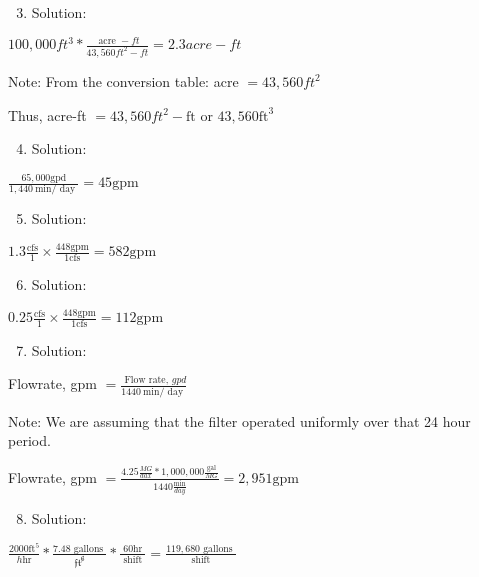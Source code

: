 \documentclass[10pt]{article}
\begin{document}
\begin{enumerate}
\begin{enumerate}
\begin{enumerate}
  \setcounter{enumi}{2}
  \item Solution:
\end{enumerate}

$100,000 f t^{3} * \frac{\text { acre }-f t}{43,560 f t^{2}-f t}=2.3 a c r e-f t$

Note: From the conversion table: acre $=43,560 f t^{2}$

Thus, acre-ft $=43,560 f t^{2}-\mathrm{ft}$ or $43,560 \mathrm{ft}^{3}$

\begin{enumerate}
  \setcounter{enumi}{3}
  \item Solution:
\end{enumerate}

$\frac{65,000 \mathrm{gpd}}{1,440 \mathrm{~min} / \text { day }}=45 \mathrm{gpm}$

\begin{enumerate}
  \setcounter{enumi}{4}
  \item Solution:
\end{enumerate}

$1.3 \frac{\mathrm{cfs}}{1} \times \frac{448 \mathrm{gpm}}{1 \mathrm{cfs}}=582 \mathrm{gpm}$

\begin{enumerate}
  \setcounter{enumi}{5}
  \item Solution:
\end{enumerate}

$0.25 \frac{\mathrm{cfs}}{1} \times \frac{448 \mathrm{gpm}}{1 \mathrm{cfs}}=112 \mathrm{gpm}$

\begin{enumerate}
  \setcounter{enumi}{6}
  \item Solution:
\end{enumerate}

Flowrate, gpm $=\frac{\text { Flow rate, } g p d}{1440 \mathrm{~min} / \text { day }}$

Note: We are assuming that the filter operated uniformly over that 24 hour period.

Flowrate, gpm $=\frac{4.25 \frac{M G}{d a x} * 1,000,000 \frac{\mathrm{gal}}{M G}}{1440 \frac{\mathrm{min}}{d a y}}=2,951 \mathrm{gpm}$

\begin{enumerate}
  \setcounter{enumi}{7}
  \item Solution:
\end{enumerate}

$\frac{2000 \mathrm{ft}^{5}}{h \mathrm{hr}} * \frac{7.48 \text { gallons }}{\mathfrak{f t}^{\not 6}} * \frac{60 \mathrm{hr}}{\text { shift }}=\frac{119,680 \text { gallons }}{\text { shift }}$


\end{enumerate}
\end{enumerate}
\end{document}
